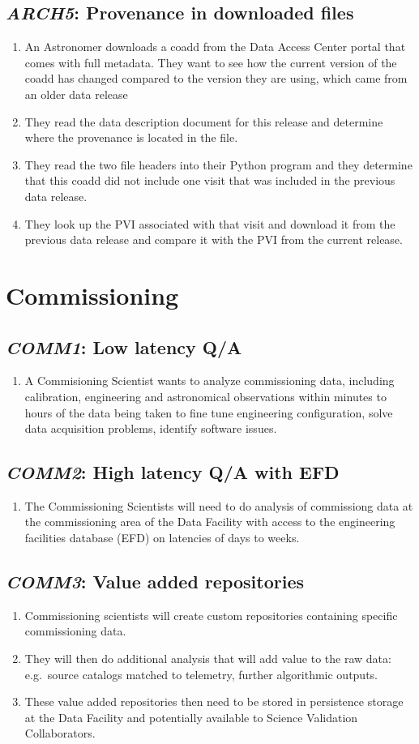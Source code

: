 \documentclass[DM,toc,lsstdraft]{lsstdoc}
\newcommand{\usecase}[3]{%
\subsection{\emph{#1}: #2}
\label{use:#1}
\begin{enumerate}[label=\alph*.]
#3
\end{enumerate}
}
\begin{document}
\usecase{ARCH5}{Provenance in downloaded files}{%

\item
An Astronomer downloads a coadd from the Data Access Center portal that comes with full metadata.
They want to see how the current version of the coadd has changed compared to the version they are using, which came from an older data release

\item
They read the data description document for this release and determine where the provenance is located in the file.

\item
They read the two file headers into their Python program and they determine that this coadd did not include one visit that was included in the previous data release.

\item
They look up the PVI associated with that visit and download it from the previous data release and compare it with the PVI from the current release.

}

\section{Commissioning}

\usecase{COMM1}{Low latency Q/A}{%

\item
A Commisioning Scientist wants to analyze commissioning data, including calibration, engineering and astronomical observations within minutes to hours of the data being taken to fine tune engineering configuration, solve data acquisition problems, identify software issues.

}

\usecase{COMM2}{High latency Q/A with EFD}{%

\item
The Commissioning Scientists will need to do analysis of commissiong data at the commissioning area of the Data Facility with access to the engineering facilities database (EFD) on latencies of days to weeks.

}

\usecase{COMM3}{Value added repositories}{%

\item
Commissioning scientists will create custom repositories containing specific commissioning data.

\item
They will then do additional analysis that will add value to the raw data: e.g.\ source catalogs matched to telemetry, further algorithmic outputs.

\item
These value added repositories then need to be stored in persistence storage at the Data Facility and potentially available to Science Validation Collaborators.

}
\end{document}
